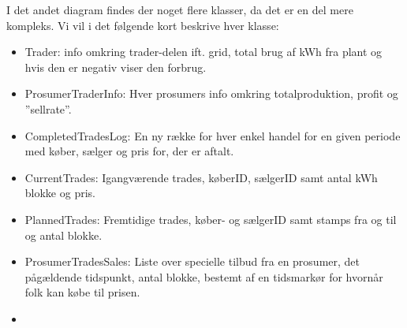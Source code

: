 I det andet diagram findes der noget flere klasser, da det er en del mere kompleks. Vi vil i det følgende kort beskrive hver klasse:
\begin{itemize}

\item Trader: info omkring trader-delen ift. grid, total brug af kWh fra plant og hvis den er negativ viser den forbrug.
\item ProsumerTraderInfo: Hver prosumers info omkring totalproduktion, profit og ”sellrate”.
\item CompletedTradesLog: En ny række for hver enkel handel for en given periode med køber, sælger og pris for, der er aftalt.
\item CurrentTrades: Igangværende trades, køberID, sælgerID samt antal kWh blokke og pris.
\item PlannedTrades: Fremtidige trades, køber- og sælgerID samt stamps fra og til og antal blokke.
\item ProsumerTradesSales: Liste over specielle tilbud fra en prosumer, det pågældende tidspunkt, antal blokke, bestemt af en tidsmarkør for hvornår folk kan købe til prisen. 
\item 
\end{itemize}




    

